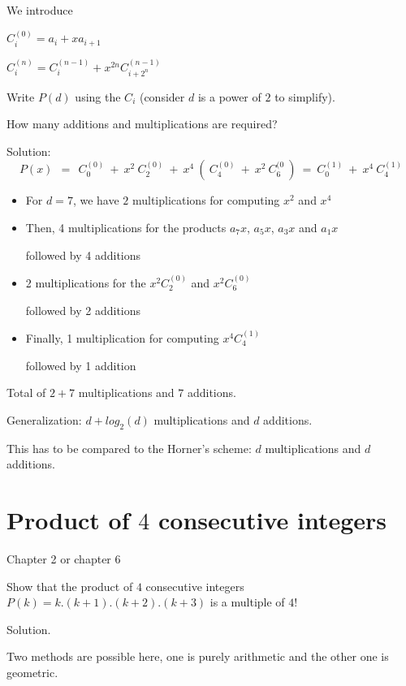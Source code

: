\documentclass{article}[12pt]
\begin{document}
We introduce 

$C_i^{(0)} = a_i + x a_{i+1}$ 

$C_i^{(n)} = C_i^{(n-1)} + x^{2n} C_{i+2^n}^{(n-1)}$ 
\bigskip

Write $P(d)$ using the $C_i$ (consider $d$ is a power of $2$ to simplify).

How many additions and multiplications are required?
\bigskip

Solution:
\[
P(x) \ \ = \ \ C_{0}^{(0)} \ + \ x^2 \ C_2^{(0)} \ + 
\ x^4 \ ( \ C_4^{(0)} \ + \ x^2 \ C_6^{(0} \ )
\ = \ C_0^{(1)} \ + \ x^4 \ C_4^{(1)} 
\]

\begin{itemize}
\item
For $d=7$, we have $2$ multiplications for computing $x^2$ and $x^4$
\item
Then, 4 multiplications for the products $a_7 x$,  $a_5 x$, $a_3 x$ and $a_1 x$

followed by 4 additions
\item
2 multiplications for the $x^2 C_2^{(0)}$ and  $x^2 C_6^{(0)}$

followed by 2 additions
\item
Finally, 1 multiplication for computing $x^4 C_4^{(1)}$

followed by 1 addition
\end{itemize}

Total of $2 + 7$ multiplications and $7$ additions.

Generalization: 
$d + log_2(d)$ multiplications and $d$ additions.
\bigskip

This has to be compared to the Horner's scheme: $d$ multiplications and $d$ additions.



\section{Product of $4$ consecutive integers}

Chapter 2 or chapter 6

Show that the product of $4$ consecutive integers $P(k) = k.(k+1).(k+2).(k+3)$
is a multiple of $4!$
\bigskip

Solution.

Two methods are possible here, one is purely arithmetic and the other one is geometric.
\end{document}
